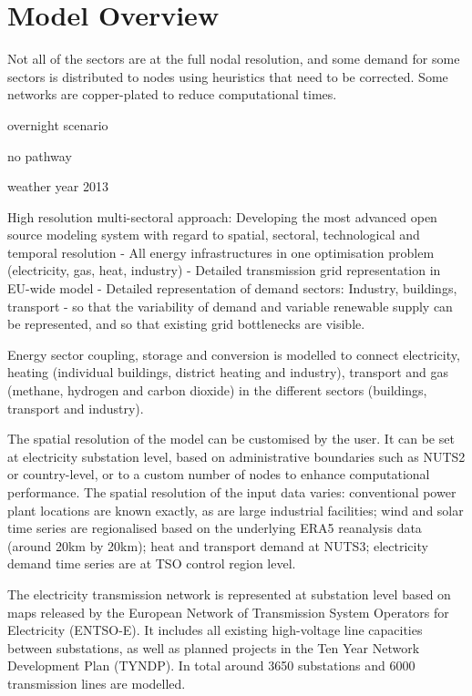 \section{Model Overview}

Not all of the sectors are at the full nodal resolution, and some demand for
some sectors is distributed to nodes using heuristics that need to be corrected.
Some networks are copper-plated to reduce computational times.

overnight scenario

no pathway

weather year 2013

High resolution multi-sectoral approach: Developing the most advanced open source modeling system with regard to spatial, sectoral, technological and temporal resolution
- All energy infrastructures in one optimisation problem (electricity, gas, heat, industry)
- Detailed transmission grid representation in EU-wide model 
- Detailed representation of demand sectors: Industry, buildings, transport
- so that the variability of demand and variable renewable supply can be represented, and so that existing grid bottlenecks are visible.

Energy sector coupling, storage and conversion is modelled to connect
electricity, heating (individual buildings, district heating and industry),
transport and gas (methane, hydrogen and carbon dioxide) in the different
sectors (buildings, transport and industry).

The spatial resolution of the model can be customised by the user. It can be set
at electricity substation level, based on administrative boundaries such as
NUTS2 or country-level, or to a custom number of nodes to enhance computational
performance. The spatial resolution of the input data varies: conventional power
plant locations are known exactly, as are large industrial facilities; wind and
solar time series are regionalised based on the underlying ERA5 reanalysis data
(around 20km by 20km); heat and transport demand at NUTS3; electricity demand
time series are at TSO control region level.

The electricity transmission
network is represented at substation level based on maps released by the
European Network of Transmission System Operators for Electricity (ENTSO-E). It
includes all existing high-voltage line capacities between substations, as well
as planned projects in the Ten Year Network Development Plan (TYNDP). In total
around 3650 substations and 6000 transmission lines are modelled.

